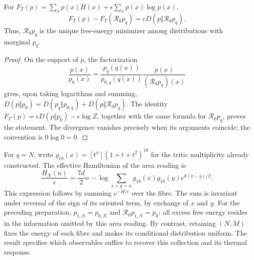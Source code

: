 \begin{proposition}
\label{ins29:v:restitucion}
For \(F_T(p)=\sum_xp(x)H(x)+\epsilon\sum_xp(x)\log p(x)\),
\[
 F_T(p)-F_T(\mathcal R_0p_q)
 =\epsilon D(p\Vert\mathcal R_0p_q).
\]
Thus, \(\mathcal R_0p_q\) is the unique free-energy minimizer among
distributions with marginal \(p_q\).
\end{proposition}
\begin{proof}
On the support of \(p\), the factorization
\[
 \frac{p(x)}{p_0(x)}=
 \frac{p_q(q(x))}{p_{0,q}(q(x))}
 \frac{p(x)}{(\mathcal R_0p_q)(x)}
\]
gives, upon taking logarithms and summing,
\(D(p\Vert p_0)=D(p_q\Vert p_{0,q})+
D(p\Vert\mathcal R_0p_q)\).
The identity \(F_T(p)=\epsilon D(p\Vert p_0)-\epsilon\log Z\),
together with the same formula for \(\mathcal R_0p_q\), proves the
statement. The divergence vanishes precisely when its arguments
coincide; the convention is \(0\log0=0\).
\end{proof}

For \(q=N\), write
\(g_{18}(x)=[t^x](1+t+t^2)^{18}\) for the tritic multiplicity already
constructed. The effective Hamiltonian of the area reading is
\[
 \frac{H_N(n)}\epsilon=
 \frac{7d}{2}n-\log\!\sum_{x+y=n}
 g_{18}(x)g_{18}(y)e^{d(x-y)/2}.
\]
This expression follows by summing \(e^{-H/\epsilon}\) over the fibre.
The sum is invariant under reversal of the sign of its oriented term,
by exchange of \(x\) and \(y\). For the preceding preparation,
\(p_{1,N}=p_{0,N}\) and \(\mathcal R_0p_{1,N}=p_0\): all excess
free energy resides in the information omitted by this area reading.
By contrast, retaining \((N,M)\) fixes the energy of each fibre and makes
its conditional distribution uniform. The result specifies which
observables suffice to recover this collection and its thermal response.
\par\endgroup
